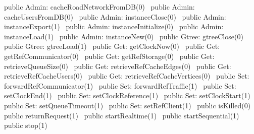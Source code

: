 public \LA{}Admin: cacheRoadNetworkFromDB(0)~{\nwtagstyle{}}\RA{}
public \LA{}Admin: cacheUsersFromDB(0)~{\nwtagstyle{}}\RA{}
public \LA{}Admin: instanceClose(0)~{\nwtagstyle{}}\RA{}
public \LA{}Admin: instanceExport(1)~{\nwtagstyle{}}\RA{}
public \LA{}Admin: instanceInitialize(0)~{\nwtagstyle{}}\RA{}
public \LA{}Admin: instanceLoad(1)~{\nwtagstyle{}}\RA{}
public \LA{}Admin: instanceNew(0)~{\nwtagstyle{}}\RA{}
public \LA{}Gtree: gtreeClose(0)~{\nwtagstyle{}}\RA{}
public \LA{}Gtree: gtreeLoad(1)~{\nwtagstyle{}}\RA{}
public \LA{}Get: getClockNow(0)~{\nwtagstyle{}}\RA{}
public \LA{}Get: getRefCommunicator(0)~{\nwtagstyle{}}\RA{}
public \LA{}Get: getRefStorage(0)~{\nwtagstyle{}}\RA{}
public \LA{}Get: retrieveQueueSize(0)~{\nwtagstyle{}}\RA{}
public \LA{}Get: retrieveRefCacheEdges(0)~{\nwtagstyle{}}\RA{}
public \LA{}Get: retrieveRefCacheUsers(0)~{\nwtagstyle{}}\RA{}
public \LA{}Get: retrieveRefCacheVertices(0)~{\nwtagstyle{}}\RA{}
public \LA{}Set: forwardRefCommunicator(1)~{\nwtagstyle{}}\RA{}
public \LA{}Set: forwardRefTraffic(1)~{\nwtagstyle{}}\RA{}
public \LA{}Set: setClockEnd(1)~{\nwtagstyle{}}\RA{}
public \LA{}Set: setClockReference(1)~{\nwtagstyle{}}\RA{}
public \LA{}Set: setClockStart(1)~{\nwtagstyle{}}\RA{}
public \LA{}Set: setQueueTimeout(1)~{\nwtagstyle{}}\RA{}
public \LA{}Set: setRefClient(1)~{\nwtagstyle{}}\RA{}
public \LA{}isKilled(0)~{\nwtagstyle{}}\RA{}
public \LA{}returnRequest(1)~{\nwtagstyle{}}\RA{}
public \LA{}startRealtime(1)~{\nwtagstyle{}}\RA{}
public \LA{}startSequential(1)~{\nwtagstyle{}}\RA{}
public \LA{}stop(1)~{\nwtagstyle{}}\RA{}
\nwendcode{}\nwdocspar

